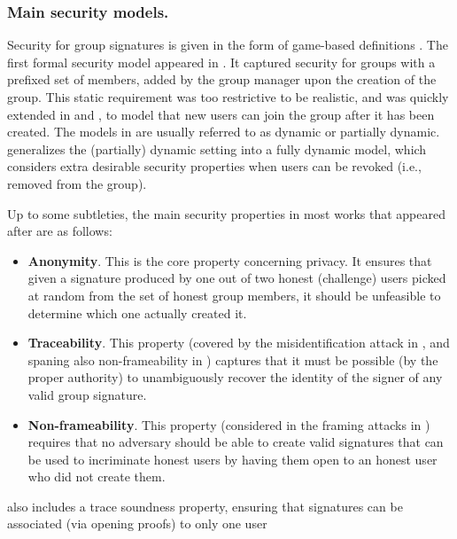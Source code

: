 \subsubsection{Main security models.}
%
Security for group signatures is given in the form of game-based definitions
\needcite.
The first formal security model appeared in \cite{bmw03}. It captured security
for groups with a prefixed set of members, added by the group manager upon the
creation of the group. This static requirement was too restrictive to be
realistic, and was quickly extended in \cite{bsz05} and \cite{kty04,ky06}, to
model that new users can join the group after it has been created. The models
in \cite{bsz05,kty04,ky06} are usually referred to as dynamic or partially
dynamic. \cite{bcc+16} generalizes the (partially) dynamic setting into a fully
dynamic model, which considers extra desirable security properties when users
can be revoked (i.e., removed from the group).

Up to some subtleties, the main security properties in most works that appeared
after \cite{bmw03,bsz05,kty04,ky06} are as follows:

\begin{itemize}
\item {\bf Anonymity}. This is the core property concerning privacy. It
  ensures that given a signature produced by one out of two honest (challenge)
  users picked at random from the set of honest group members, it should be
  unfeasible to determine which one actually created it. 
  
\item {\bf Traceability}. This property (covered by the misidentification attack
  in \cite{kty04,ky06}, and spaning also non-frameability in \cite{bmw03})
  captures that it must be possible (by the proper authority) to unambiguously
  recover the identity of the signer of any valid group signature.

\item {\bf Non-frameability}. This property (considered in the framing attacks
  in \cite{kty04,ky06}) requires that no adversary should be able to create
  valid signatures that can be used to incriminate honest users by having them
  open to an honest user who did not create them.
 
\end{itemize}

\cite{bcc+16} also includes a trace soundness property, ensuring that signatures
can be associated (via opening proofs) to only one user 

